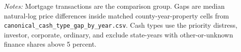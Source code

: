\begin{table}[!htbp]
\centering
\caption{Canonical property-adjusted cash-mortgage gaps by cash-buyer type, 2024}
\label{tab:cash-type-gaps}
\begin{minipage}{0.92\linewidth}
\footnotesize\raggedright
\emph{Notes:} Mortgage transactions are the comparison group. Gaps are median natural-log price differences inside matched county-year-property cells from \texttt{canonical\_cash\_type\_gap\_by\_year.csv}. Cash types use the priority distress, investor, corporate, ordinary, and exclude state-years with other-or-unknown finance shares above 5 percent.
\end{minipage}
\end{table}
